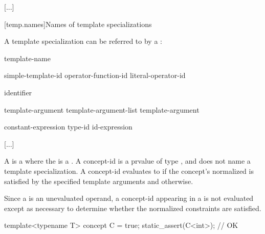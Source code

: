 \documentclass{wg21}
\begin{document}



\textcolor{noteclr}{[...]}

[temp.names]{Names of template specializations}

\pnum
A template specialization  can be referred to by a
:

\begin{bnf}
    \br
    template-name \terminal{<}  \terminal{>}
\end{bnf}

\begin{bnf}
    \br
    simple-template-id\br
    operator-function-id \terminal{<}  \terminal{>}\br
    literal-operator-id \terminal{<}  \terminal{>}
\end{bnf}

\begin{bnf}
    \br
    identifier
\end{bnf}

\begin{bnf}
    \br
    template-argument \br
    template-argument-list \terminal{,} template-argument 
\end{bnf}

\begin{bnf}
    \br
    constant-expression\br
    type-id\br
    id-expression\br
\end{bnf}



\textcolor{noteclr}{[...]}

\pnum
A  is a 
where the  is a .
A concept-id is a prvalue of type , and
does not name a template specialization.
A concept-id evaluates to 
if the concept's
normalized  
is satisfied  by the specified template arguments and
 otherwise.
\begin{note}
    Since a  is an unevaluated operand,
    a concept-id appearing in a 
    is not evaluated except as necessary
    to determine whether the normalized constraints are satisfied.
\end{note}
\begin{example}
    \begin{codeblock}
        template<typename T> concept C = true;
        static_assert(C<int>);      // OK
    \end{codeblock}
\end{example}
\end{document}
